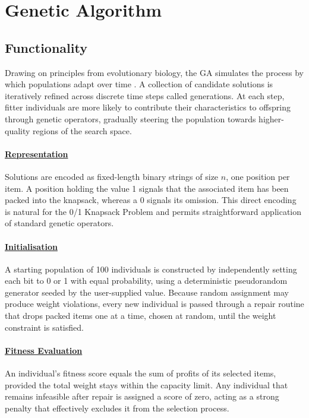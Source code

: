 \documentclass[12pt, a4paper]{article}
\begin{document}
\section{Genetic Algorithm}

\subsection{Functionality}

Drawing on principles from evolutionary biology, the GA simulates the process by which populations adapt over time \cite{khuri1994}. A collection of candidate solutions is iteratively refined across discrete time steps called generations. At each step, fitter individuals are more likely to contribute their characteristics to offspring through genetic operators, gradually steering the population towards higher-quality regions of the search space.

\paragraph*{\underline{Representation}}

Solutions are encoded as fixed-length binary strings of size $n$, one position per item. A position holding the value 1 signals that the associated item has been packed into the knapsack, whereas a 0 signals its omission. This direct encoding is natural for the 0/1 Knapsack Problem and permits straightforward application of standard genetic operators.

\paragraph*{\underline{Initialisation}}

A starting population of 100 individuals is constructed by independently setting each bit to 0 or 1 with equal probability, using a deterministic pseudorandom generator seeded by the user-supplied value. Because random assignment may produce weight violations, every new individual is passed through a repair routine that drops packed items one at a time, chosen at random, until the weight constraint is satisfied.

\paragraph*{\underline{Fitness Evaluation}}

An individual's fitness score equals the sum of profits of its selected items, provided the total weight stays within the capacity limit. Any individual that remains infeasible after repair is assigned a score of zero, acting as a strong penalty that effectively excludes it from the selection process.
\end{document}
